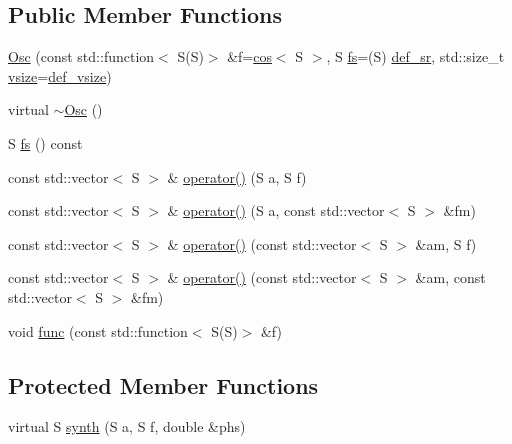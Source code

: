 \subsection*{Public Member Functions}
\begin{DoxyCompactItemize}
\item 
\hyperlink{class_aurora_1_1_osc_a573db635ae7ae8fba798d572ee4b992e}{Osc} (const std\+::function$<$ S(S)$>$ \&f=\hyperlink{namespace_aurora_ab6ef1b966b8f27d107fcabe1027a677a}{cos}$<$ S $>$, S \hyperlink{class_aurora_1_1_osc_a9ac3aa9006fc98588b2163e0e56f6e30}{fs}=(S) \hyperlink{namespace_aurora_ad49263d809bea98dd422e95bc91bc03e}{def\+\_\+sr}, std\+::size\+\_\+t \hyperlink{class_aurora_1_1_snd_base_af9e21aaf411b17f7a8221c991ce5d291}{vsize}=\hyperlink{namespace_aurora_afaaddf667a06e7ce23c667a8b7295263}{def\+\_\+vsize})
\item 
virtual \hyperlink{class_aurora_1_1_osc_a95062ac1670f5de00a27c33bfb4eb117}{$\sim$\+Osc} ()
\item 
S \hyperlink{class_aurora_1_1_osc_a9ac3aa9006fc98588b2163e0e56f6e30}{fs} () const
\item 
const std\+::vector$<$ S $>$ \& \hyperlink{class_aurora_1_1_osc_a2a36c0afda86b6fabad4ed3ca0f510af}{operator()} (S a, S f)
\item 
const std\+::vector$<$ S $>$ \& \hyperlink{class_aurora_1_1_osc_af48611ef63363221de325d8976a1ec56}{operator()} (S a, const std\+::vector$<$ S $>$ \&fm)
\item 
const std\+::vector$<$ S $>$ \& \hyperlink{class_aurora_1_1_osc_a28fe97e5634b8a02474657ed456c326b}{operator()} (const std\+::vector$<$ S $>$ \&am, S f)
\item 
const std\+::vector$<$ S $>$ \& \hyperlink{class_aurora_1_1_osc_a06f9ead5fbf828f7ebb8617ac6cb24b4}{operator()} (const std\+::vector$<$ S $>$ \&am, const std\+::vector$<$ S $>$ \&fm)
\item 
void \hyperlink{class_aurora_1_1_osc_a3e20a4f476e10209533a25d2abfc2af8}{func} (const std\+::function$<$ S(S)$>$ \&f)
\end{DoxyCompactItemize}
\subsection*{Protected Member Functions}
\begin{DoxyCompactItemize}
\item 
virtual S \hyperlink{class_aurora_1_1_osc_a4e01fb1238c931c944b6b27c3790495e}{synth} (S a, S f, double \&phs)
\end{DoxyCompactItemize}
